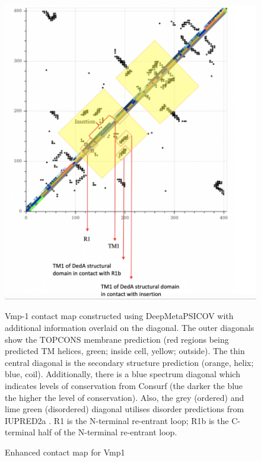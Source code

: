 \begin{figure}[th!]
    \centering
    \includegraphics[width=150mm, scale =0.5]{Results/vmp1.png}
    \caption{Enhanced contact map for Vmp1}
    \label{fig:vmp1}
    \small
    Vmp-1 contact map constructed using DeepMetaPSICOV with additional information overlaid on the
diagonal. The outer diagonals show the TOPCONS membrane prediction (red regions being predicted TM helices, green; inside cell, yellow; outside). The thin central diagonal is the secondary structure prediction (orange, helix; blue, coil). Additionally, there is a blue spectrum diagonal which indicates levels of conservation from Consurf \cite{Ashkenazy2016} (the darker the blue the higher the level of conservation). Also, the grey (ordered) and lime green (disordered) diagonal utilises disorder predictions from IUPRED2a \cite{Meszaros2018}. R1 is the N-terminal re-entrant loop; R1b is the C-terminal half of the N-terminal re-entrant loop.
\end{figure}

